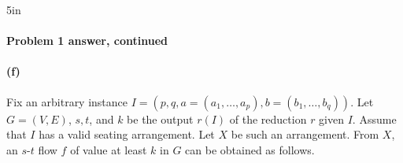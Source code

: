 \begin{answerBox}{5in}
\begin{center}
\begin{blue}


    \end{blue}
  \end{center}


  \medskip


  \begin{blue}

    \REPLACEME

  \end{blue}

\end{answerBox}


\newpage

\paragraph{Problem 1 answer, continued}

\paragraph{(f)} 


Fix an arbitrary  instance $I=(p, q, a=(a_1, \ldots, a_p), b=(b_1,\ldots, b_q))$.
Let $G=(V,E)$, $s, t$, and $k$ be the output $r(I)$ of the reduction $r$ given $I$.
Assume that $I$ has a valid seating arrangement.
Let $X$ be such an arrangement.
From $X$, an $s$-$t$ flow $f$ of value at least $k$ in $G$ can be obtained as follows.

